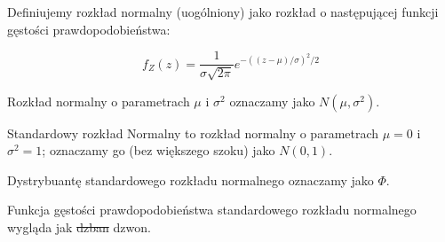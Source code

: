 \begin{definition}
    Definiujemy rozkład normalny (uogólniony) jako rozkład o następującej funkcji gęstości prawdopodobieństwa: 

    \[ f_Z(z) =  \frac{1}{\sigma\sqrt{2\pi}}e^{-((z - \mu)/\sigma)^2/2} \]
\end{definition}

\begin{definition}
    Rozkład normalny o parametrach \(\mu\) i \(\sigma^2\) oznaczamy jako \(N(\mu , \sigma^2 )\).
\end{definition}

\begin{definition}
    Standardowy rozkład Normalny to rozkład normalny o parametrach \( \mu = 0\) i \( \sigma^2 = 1\); oznaczamy go (bez większego szoku) jako \(N(0, 1)\).
\end{definition}

\begin{definition}
    Dystrybuantę standardowego rozkładu normalnego oznaczamy jako \( \Phi \).
\end{definition}

Funkcja gęstości prawdopodobieństwa standardowego rozkładu normalnego wygląda jak \sout{dzban} dzwon.

\begin{center}
\end{center}
